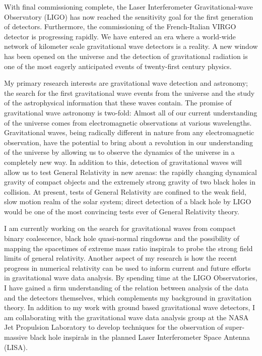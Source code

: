 With final commissioning complete, the Laser Interferometer Gravitational-wave
Observatory (LIGO) has now reached the sensitivity goal for the first
generation of detectors. Furthermore, the commissioning of the French-Italian
VIRGO detector is progressing rapidly. We have entered an era where a
world-wide network of kilometer scale gravitational wave detectors is a
reality. A new window has been opened on the universe and the detection of
gravitational radiation is one of the most eagerly anticipated events of
twenty-first century physics.

My primary research interests are gravitational wave detection and astronomy;
the search for the first gravitational wave events from the universe and the
study of the astrophysical information that these waves contain. The promise
of gravitational wave astronomy is two-fold: Almost all of our current
understanding of the universe comes from electromagnetic observations at
various wavelengths.  Gravitational waves, being radically different in nature
from any electromagnetic observation, have the potential to bring about a
revolution in our understanding of the universe by allowing us to observe the
dynamics of the universe in a completely new way. In addition to this,
detection of gravitational waves will allow us to test General Relativity in
new arenas: the rapidly changing dynamical gravity of compact objects and the
extremely strong gravity of two black holes in collision. At present, tests of
General Relativity are confined to the weak field, slow motion realm of the
solar system; direct detection of a black hole by LIGO would be one of the
most convincing tests ever of General Relativity theory.

I am currently working on the search for gravitational waves from compact
binary coalescence, black hole quasi-normal ringdowns and the possibility of
mapping the spacetimes of extreme mass ratio inspirals to probe the strong
field limits of general relativity. Another aspect of my research is how the
recent progress in numerical relativity can be used to inform current and
future efforts in gravitational wave data analysis. By spending time at the
LIGO Observatories, I have gained a firm understanding of the relation between
analysis of the data and the detectors themselves, which complements my
background in gravitation theory. In addition to my work with ground based
gravitational wave detectors, I am collaborating with the gravitational wave
data analysis group at the NASA Jet Propulsion Laboratory to develop 
techniques for the observation of super-massive black hole inspirals in
the planned Laser Interferometer Space Antenna (LISA).

